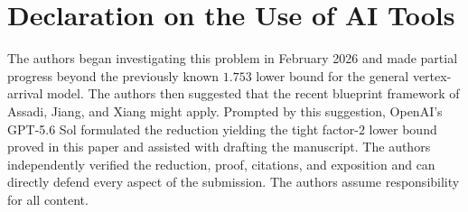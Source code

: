 \section*{Declaration on the Use of AI Tools}

The authors began investigating this problem in February 2026 and made partial
progress beyond the previously known $1.753$ lower bound for the general
vertex-arrival model.  The authors then suggested that the recent blueprint
framework of Assadi, Jiang, and Xiang might apply.  Prompted by this suggestion,
OpenAI's GPT-5.6 Sol formulated the reduction yielding the tight factor-$2$
lower bound proved in this paper and assisted with drafting the manuscript.
The authors independently verified the reduction, proof, citations, and
exposition and can directly defend every aspect of the submission.  The authors
assume responsibility for all content.
